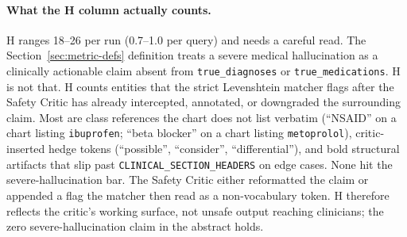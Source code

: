 \documentclass[twocolumn,10pt,main=USenglish]{asmeconf}
\begin{document}
\paragraph*{What the H column actually counts.} H ranges
\num{18}--\num{26} per run (\num{0.7}--\num{1.0} per query) and
needs a careful read. The Section~\ref{sec:metric-defs}
definition treats a severe medical hallucination as a clinically
actionable claim absent from \texttt{true\_diagnoses} or
\texttt{true\_medications}. H is not that. H counts entities that
the strict Levenshtein matcher flags after the Safety Critic has
already intercepted, annotated, or downgraded the surrounding
claim. Most are class references the chart does not list
verbatim (``NSAID'' on a chart listing \texttt{ibuprofen}; ``beta
blocker'' on a chart listing \texttt{metoprolol}), critic-inserted
hedge tokens (``possible'', ``consider'', ``differential''), and
bold structural artifacts that slip past
\texttt{CLINICAL\_SECTION\_HEADERS} on edge cases. None hit the
severe-hallucination bar. The Safety Critic either reformatted
the claim or appended a flag the matcher then read as a
non-vocabulary token. H therefore reflects the critic's working
surface, not unsafe output reaching clinicians; the zero
severe-hallucination claim in the abstract holds.
\end{document}
